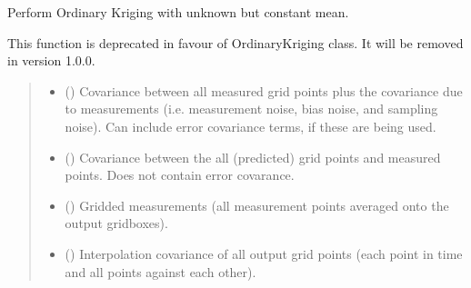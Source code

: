 \documentclass[letterpaper,10pt,english]{sphinxmanual}
\begin{document}
\begin{fulllineitems}
\label{\detokenize{kriging:glomar_gridding.kriging.kriging_ordinary}}
\pysigstartsignatures
\pysiglinewithargsret
{}
{\sphinxparamcomma {}\sphinxparamcomma {}\sphinxparamcomma {}}
{}
\pysigstopsignatures
\sphinxAtStartPar
Perform Ordinary Kriging with unknown but constant mean.

\sphinxAtStartPar
This function is deprecated in favour of OrdinaryKriging class. It will be
removed in version 1.0.0.
\begin{quote}\begin{description}
\begin{itemize}
\item {}
\sphinxAtStartPar
{} (\sphinxstyleliteralemphasis{\sphinxupquote{{[}}}\sphinxstyleliteralemphasis{\sphinxupquote{{]}}}) \textendash{} Covariance between all measured grid points plus the covariance due to
measurements (i.e. measurement noise, bias noise, and sampling noise).
Can include error covariance terms, if these are being used.

\item {}
\sphinxAtStartPar
{} (\sphinxstyleliteralemphasis{\sphinxupquote{{[}}}\sphinxstyleliteralemphasis{\sphinxupquote{{]}}}) \textendash{} Covariance between the all (predicted) grid points and measured points.
Does not contain error covarance.

\item {}
\sphinxAtStartPar
{} (\sphinxstyleliteralemphasis{\sphinxupquote{{[}}}\sphinxstyleliteralemphasis{\sphinxupquote{{]}}}) \textendash{} Gridded measurements (all measurement points averaged onto the output
gridboxes).

\item {}
\sphinxAtStartPar
{} (\sphinxstyleliteralemphasis{\sphinxupquote{{[}}}\sphinxstyleliteralemphasis{\sphinxupquote{{]}}}) \textendash{} Interpolation covariance of all output grid points (each point in time
and all points against each other).


\end{itemize}
\end{description}
\end{quote}
\end{fulllineitems}
\end{document}
